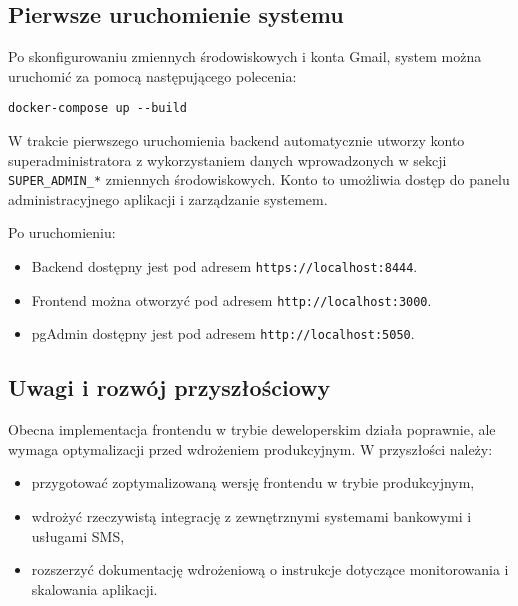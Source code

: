 \subsection{Pierwsze uruchomienie systemu}

Po skonfigurowaniu zmiennych środowiskowych i konta Gmail, system można uruchomić za pomocą następującego polecenia:
\begin{verbatim}
docker-compose up --build
\end{verbatim}

W trakcie pierwszego uruchomienia backend automatycznie utworzy konto superadministratora z wykorzystaniem danych wprowadzonych w sekcji \texttt{SUPER\_ADMIN\_*} zmiennych środowiskowych. Konto to umożliwia dostęp do panelu administracyjnego aplikacji i zarządzanie systemem.


Po uruchomieniu:
\begin{itemize}
    \item Backend dostępny jest pod adresem \texttt{https://localhost:8444}.
    \item Frontend można otworzyć pod adresem \texttt{http://localhost:3000}.
    \item pgAdmin dostępny jest pod adresem \texttt{http://localhost:5050}.
\end{itemize}

\subsection{Uwagi i rozwój przyszłościowy}

Obecna implementacja frontendu w trybie deweloperskim działa poprawnie, ale wymaga optymalizacji przed wdrożeniem produkcyjnym. W przyszłości należy:
\begin{itemize}
    \item przygotować zoptymalizowaną wersję frontendu w trybie produkcyjnym,
    \item wdrożyć rzeczywistą integrację z zewnętrznymi systemami bankowymi i usługami SMS,
    \item rozszerzyć dokumentację wdrożeniową o instrukcje dotyczące monitorowania i skalowania aplikacji.
\end{itemize}
